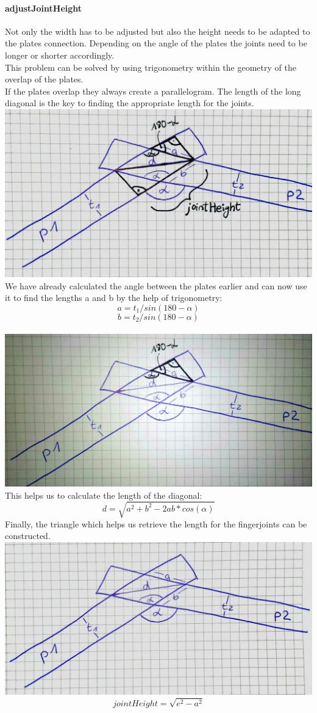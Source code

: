 \documentclass[../ClassicThesis.tex]{subfiles}
\begin{document}
    \paragraph{adjustJointHeight}
    Not only the width has to be adjusted but also the height needs to be adapted to the plates connection. Depending on the angle of the plates the joints need to be longer or shorter accordingly.\\
    This problem can be solved by using trigonometry within the geometry of the overlap of the plates.\\
    If the plates overlap they always create a parallelogram. The length of the long diagonal is the key to finding the appropriate length for the joints.\\
    \includegraphics[width=0.5\columnwidth]{Images/06-2-joints-newJointHeight1.jpg}\\
    We have already calculated the angle between the plates earlier and can now use it to find the lengths a and b by the help of trigonometry:\\
    $$ a = t_1 / sin(180 - \alpha)$$
    $$ b = t_2 / sin(180 - \alpha)$$\\
    \includegraphics[width=0.5\columnwidth]{Images/06-2-joints-newJointHeight2.jpg}\\
    This helps us to calculate the length of the diagonal:
    $$ d = \sqrt{a^2 + b^2 - 2ab * cos(\alpha)}$$
    Finally, the triangle which helps us retrieve the length for the fingerjoints can be constructed. \\
    \includegraphics[width=0.5\columnwidth]{Images/06-2-joints-newJointHeight3.jpg}\\
    $$ jointHeight = \sqrt{e^2 - a^2} $$
    
\end{document}
